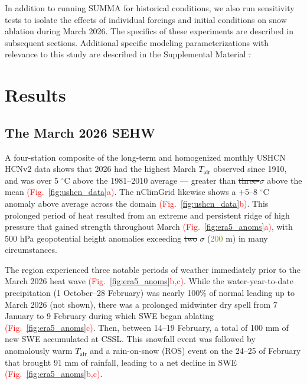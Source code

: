 \documentclass[draft]{agujournal2019}
\newcommand{\fig}[2]{\textcolor{red}{(Fig.~\ref{#1}{#2})}}   %
\newcommand{\mynum}[1]{\textcolor{olive}{#1}}
\newcommand{\tair}{\textcolor{black}{$T_{\mathrm{air}}$}\xspace}
\providecommand{\DIFadd}[1]{{\protect\color{blue}\uwave{#1}}} %
\providecommand{\DIFdel}[1]{{\protect\color{red}\sout{#1}}}                      %
\providecommand{\DIFaddbegin}{} %
\providecommand{\DIFaddend}{} %
\providecommand{\DIFdelbegin}{} %
\providecommand{\DIFdelend}{} %
\begin{document}
In addition to running SUMMA for historical conditions, we also run sensitivity tests to isolate the effects of individual forcings and initial conditions on snow ablation during March 2026. 
The specifics of these experiments are described in subsequent sections.
Additional specific modeling parameterizations with relevance to this study are described in the Supplemental Material \DIFdelbegin \DIFdel{.
}\DIFdelend \DIFaddbegin \DIFadd{(Sec.~\ref{supp:summa_desc_model_eq}).
}\DIFaddend 



\section{Results}

\subsection{The March 2026 SEHW}
A four-station composite of the long-term and homogenized monthly USHCN HCNv2 data shows that 2026 had the highest March \tair observed since 1910, and was over 5 $^\circ$C above the 1981--2010 average --- greater than \DIFdelbegin \DIFdel{three-}\DIFdelend \DIFaddbegin \DIFadd{3-}\DIFaddend $\sigma$ above the mean \fig{fig:ushcn_data}{a}.
The nClimGrid likewise shows a +5--8 $^\circ$C anomaly above average across the domain \fig{fig:ushcn_data}{b}.
This prolonged period of heat resulted from an extreme and persistent ridge of high pressure that gained strength throughout March \fig{fig:era5_anoms}{a}, with 500 hPa geopotential height anomalies exceeding \DIFdelbegin \DIFdel{two }\DIFdelend \DIFaddbegin \DIFadd{2-}\DIFaddend $\sigma$ (\mynum{200} m) in many circumstances. 

The region experienced three notable periods of weather immediately prior to the March 2026 heat wave \fig{fig:era5_anoms}{b,c}. 
While the water-year-to-date precipitation (1 October--28 February) was nearly 100\% of normal leading up to March 2026 (not shown), there was a prolonged midwinter dry spell \cite{Hatchett2023} from 7 January to 9 February during which SWE began ablating \fig{fig:era5_anoms}{c}.
Then, between 14--19 February, a total of 100 mm of new SWE accumulated at CSSL.
This snowfall event was followed by anomalously warm \tair and a rain-on-snow (ROS) event on the 24--25 of February that brought 91 mm of rainfall, leading to a net decline in SWE \fig{fig:era5_anoms}{b,c}. %
\end{document}
